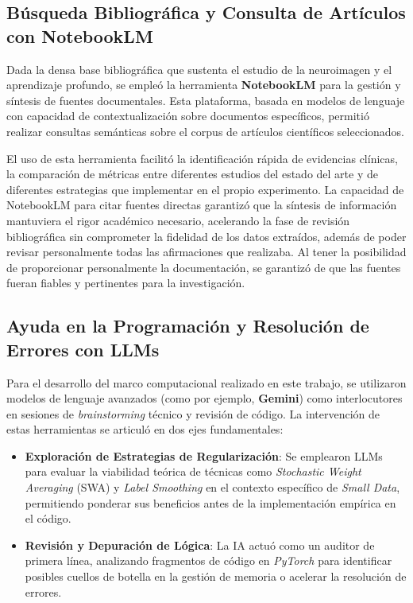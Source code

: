 \documentclass[12pt, oneside, english, spanish]{book}
\begin{document}
\subsection{Búsqueda Bibliográfica y Consulta de Artículos con NotebookLM} \label{subsec:ia_notebooklm}

Dada la densa base bibliográfica que sustenta el estudio de la neuroimagen y el aprendizaje profundo, se empleó la herramienta \textbf{NotebookLM} para la gestión y síntesis de fuentes documentales. Esta plataforma, basada en modelos de lenguaje con capacidad de contextualización sobre documentos específicos, permitió realizar consultas semánticas sobre el corpus de artículos científicos seleccionados. 

El uso de esta herramienta facilitó la identificación rápida de evidencias clínicas, la comparación de métricas entre diferentes estudios del estado del arte y de diferentes estrategias que implementar en el propio experimento. La capacidad de NotebookLM para citar fuentes directas garantizó que la síntesis de información mantuviera el rigor académico necesario, acelerando la fase de revisión bibliográfica sin comprometer la fidelidad de los datos extraídos, además de poder revisar personalmente todas las afirmaciones que realizaba. Al tener la posibilidad de proporcionar personalmente la documentación, se garantizó de que las fuentes fueran fiables y pertinentes para la investigación. 

\subsection{Ayuda en la Programación y Resolución de Errores con LLMs} \label{subsec:ia_codiseno}

Para el desarrollo del marco computacional realizado en este trabajo, se utilizaron modelos de lenguaje avanzados (como por ejemplo, \textbf{Gemini}) como interlocutores en sesiones de \textit{brainstorming} técnico y revisión de código. La intervención de estas herramientas se articuló en dos ejes fundamentales:

\begin{itemize}
	\item \textbf{Exploración de Estrategias de Regularización}: Se emplearon LLMs para evaluar la viabilidad teórica de técnicas como \textit{Stochastic Weight Averaging} (SWA) y \textit{Label Smoothing} en el contexto específico de \textit{Small Data}, permitiendo ponderar sus beneficios antes de la implementación empírica en el código.
	\item \textbf{Revisión y Depuración de Lógica}: La IA actuó como un auditor de primera línea, analizando fragmentos de código en \textit{PyTorch} para identificar posibles cuellos de botella en la gestión de memoria o acelerar la resolución de errores.
\end{itemize}
\end{document}
